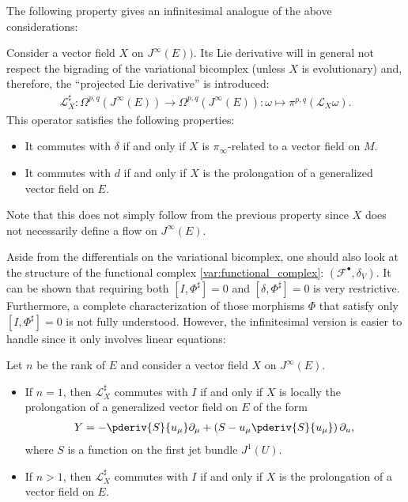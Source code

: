     The following property gives an infinitesimal analogue of the above considerations:
    \begin{property}
        Consider a vector field $X$ on $J^\infty(E))$. Its Lie derivative will in general not respect the bigrading of the variational bicomplex (unless $X$ is evolutionary) and, therefore, the ``projected Lie derivative'' is introduced:
        \begin{gather}
            \mathcal{L}^\sharp_X:\Omega^{p,q}(J^\infty(E))\rightarrow\Omega^{p,q}(J^\infty(E)):\omega\mapsto\pi^{p,q}(\mathcal{L}_X\omega).
        \end{gather}
        This operator satisfies the following properties:
        \begin{itemize}
            \item It commutes with $\delta$ if and only if $X$ is $\pi_\infty$-related to a vector field on $M$.
            \item It commutes with $d$ if and only if $X$ is the prolongation of a generalized vector field on $E$.
        \end{itemize}
        Note that this does not simply follow from the previous property since $X$ does not necessarily define a flow on $J^\infty(E)$.
    \end{property}

    Aside from the differentials on the variational bicomplex, one should also look at the structure of the functional complex \eqref{var:functional_complex}: $(\mathcal{F}^\bullet,\delta_V)$. It can be shown that requiring both $[I,\Phi^\sharp]=0$ and $[\delta,\Phi^\sharp]=0$ is very restrictive. Furthermore, a complete characterization of those morphisms $\Phi$ that satisfy only $[I,\Phi^\sharp]=0$ is not fully understood. However, the infinitesimal version is easier to handle since it only involves linear equations:
    \begin{property}
        Let $n$ be the rank of $E$ and consider a vector field $X$ on $J^\infty(E)$.
        \begin{itemize}
            \item If $n=1$, then $\mathcal{L}^\sharp_X$ commutes with $I$ if and only if $X$ is locally the prolongation of a generalized vector field on $E$ of the form
            \begin{gather}
                Y = -\pderiv{S}{u_\mu}\partial_\mu + \left(S - u_\mu\pderiv{S}{u_\mu}\right)\partial_u,
            \end{gather}
            where $S$ is a function on the first jet bundle $J^1(U)$.
            \item If $n>1$, then $\mathcal{L}^\sharp_X$ commutes with $I$ if and only if $X$ is the prolongation of a vector field on $E$.
        \end{itemize}
    \end{property}

